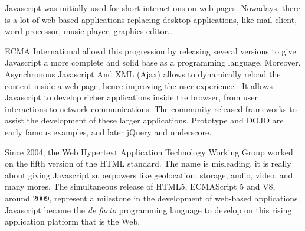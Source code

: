 Javascript was initially used for short interactions on web pages.
Nowadays, there is a lot of web-based applications replacing desktop applications, like mail client, word processor, music player, graphics editor\ldots

ECMA International allowd this progression by releasing several versions to give Javascript a more complete and solid base as a programming language.
Moreover, %
Asynchronous Javascript And XML (Ajax) allows to dynamically reload the content inside a web page, hence improving the user experience \cite{Garrett2005}.
It allows Javascript to develop richer applications inside the browser, from user interactions to network communications.
The community released frameworks to assist the development of these larger applications.
Prototype and DOJO are early famous examples, and later jQuery and underscore.


Since 2004, the Web Hypertext Application Technology Working Group worked on the fifth version of the HTML standard.
The name is misleading, it is really about giving Javascript superpowers like geolocation, storage, audio, video, and many mores.
The simultaneous release of HTML5, ECMAScript 5 and V8, around 2009, represent a milestone in the development of web-based applications.
Javascript became the \textit{de facto} programming language to develop on this rising application platform that is the Web.

